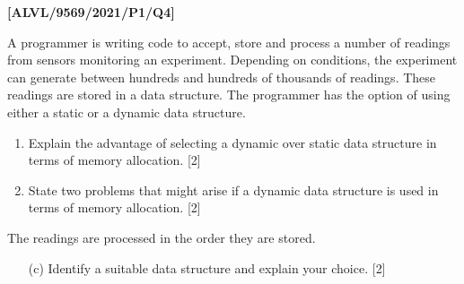 \item \textbf{{[}ALVL/9569/2021/P1/Q4{]} }

A programmer is writing code to accept, store and process a number
of readings from sensors monitoring an experiment. Depending on conditions,
the experiment can generate between hundreds and hundreds of thousands
of readings. These readings are stored in a data structure. The programmer
has the option of using either a static or a dynamic data structure.
\begin{enumerate}
\item Explain the advantage of selecting a dynamic over static data structure
in terms of memory allocation. \hfill{} {[}2{]}
\item State two problems that might arise if a dynamic data structure is
used in terms of memory allocation. \hfill{}{[}2{]}
\end{enumerate}
The readings are processed in the order they are stored.
\begin{enumerate}
\item[(c)]  Identify a suitable data structure and explain your choice. \hfill{}{[}2{]}
\end{enumerate}